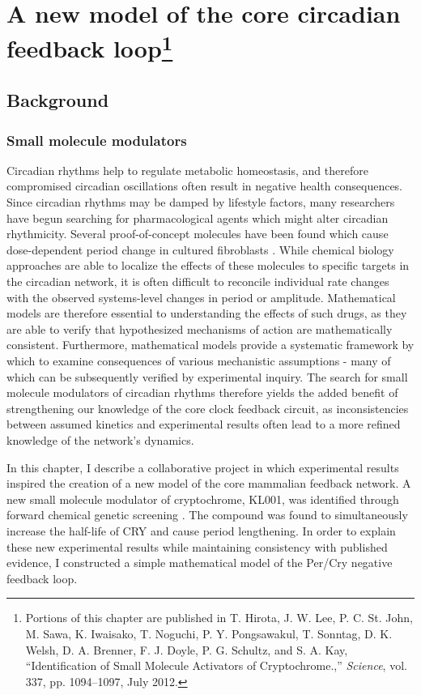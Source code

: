 \chapter[A new model of the core circadian feedback loop]{A new model of the core circadian feedback loop\footnote{ Portions of this chapter are published in T. Hirota, J. W. Lee, P. C. St. John, M. Sawa, K. Iwaisako, T. Noguchi, P. Y. Pongsawakul, T. Sonntag, D. K. Welsh, D. A. Brenner, F. J. Doyle, P. G. Schultz, and S. A. Kay, ``Identification of Small Molecule Activators of Cryptochrome.,'' {\itshape Science}, vol. 337, pp. 1094–1097, July 2012.}}\label{chap:model}

\section{Background}

\subsection{Small molecule modulators}
Circadian rhythms help to regulate metabolic homeostasis, and therefore compromised circadian oscillations often result in negative health consequences.
Since circadian rhythms may be damped by lifestyle factors, many researchers have begun searching for pharmacological agents which might alter circadian rhythmicity.
Several proof-of-concept molecules have been found which cause dose-dependent period change in cultured fibroblasts \cite{Chen2013}.
While chemical biology approaches are able to localize the effects of these molecules to specific targets in the circadian network, it is often difficult to reconcile individual rate changes with the observed systems-level changes in period or amplitude.
Mathematical models are therefore essential to understanding the effects of such drugs, as they are able to verify that hypothesized mechanisms of action are mathematically consistent.
Furthermore, mathematical models provide a systematic framework by which to examine consequences of various mechanistic assumptions - many of which can be subsequently verified by experimental inquiry.
The search for small molecule modulators of circadian rhythms therefore yields the added benefit of strengthening our knowledge of the core clock feedback circuit, as inconsistencies between assumed kinetics and experimental results often lead to a more refined knowledge of the network's dynamics.

In this chapter, I describe a collaborative project in which experimental results inspired the creation of a new model of the core mammalian feedback network.
A new small molecule modulator of cryptochrome, KL001, was identified through forward chemical genetic screening \cite{Hirota2012}.
The compound was found to simultaneously increase the half-life of CRY and cause period lengthening.
In order to explain these new experimental results while maintaining consistency with published evidence, I constructed a simple mathematical model of the Per/Cry negative feedback loop.

